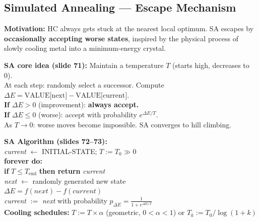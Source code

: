 \documentclass[12pt, a4paper]{article}
\newenvironment{solutionbox}{\begin{mdframed}[style=solutionframe]}{\end{mdframed}}
\begin{document}
\subsection{Simulated Annealing — Escape Mechanism}

\noindent\textbf{Motivation:} HC always gets stuck at the nearest local optimum. SA escapes by \textbf{occasionally accepting worse states}, inspired by the physical process of slowly cooling metal into a minimum-energy crystal.

\vspace{0.4em}

\begin{solutionbox}
\textbf{SA core idea (slide 71):} Maintain a temperature $T$ (starts high, decreases to 0).\\
At each step: randomly select a successor. Compute $\Delta E = \text{VALUE[next]} - \text{VALUE[current]}$.\\
\textbf{If} $\Delta E > 0$ (improvement): \textbf{always accept.}\\
\textbf{If} $\Delta E \leq 0$ (worse): accept with probability $e^{\Delta E / T}$.\\
As $T \to 0$: worse moves become impossible. SA converges to hill climbing.
\end{solutionbox}

\vspace{0.4em}

\begin{mdframed}[style=notesframe]
\textbf{SA Algorithm (slides 72--73):}\\[0.3em]
\textit{current} $\leftarrow$ INITIAL-STATE; \quad $T := T_0 \gg 0$\\
\textbf{forever do:}\\
\hspace{1.5em}\textbf{if} $T \leq T_{\text{end}}$ \textbf{then return} \textit{current}\\
\hspace{1.5em}\textit{next} $\leftarrow$ randomly generated new state\\
\hspace{1.5em}$\Delta E = f(\textit{next}) - f(\textit{current})$\\
\hspace{1.5em}\textit{current} $:=$ \textit{next} with probability $\displaystyle p_{\Delta E} = \frac{1}{1 + e^{\Delta E/T}}$\\[0.3em]
\textbf{Cooling schedules:} $T := T \times \alpha$ (geometric, $0 < \alpha < 1$) \quad or \quad $T_k := T_0 / \log(1+k)$
\end{mdframed}
\end{document}
